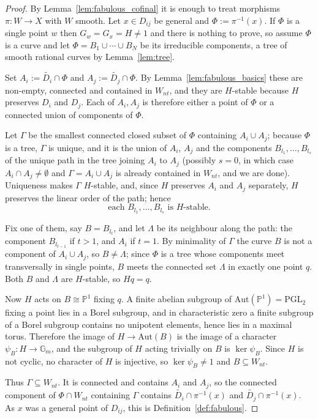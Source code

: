 \documentclass[11pt]{amsart}
\theoremstyle{plain}
\theoremstyle{definition}
\theoremstyle{remark}
\numberwithin{equation}{section}
\begin{document}
\begin{proof}
By Lemma~\ref{lem:fabulous_cofinal} it is enough to treat morphisms
$\pi : W \to X$ with $W$ smooth.  Let $x \in D_{ij}$ be general and
$\Phi := \pi^{-1}(x)$.  If $\Phi$ is a single point $w$ then
$G_w = G_x = H \neq 1$ and there is nothing to prove, so assume $\Phi$ is a
curve and let $\Phi = B_1 \cup \cdots \cup B_N$ be its irreducible
components, a tree of smooth rational curves by Lemma~\ref{lem:tree}.

Set $A_i := \widetilde{D_i} \cap \Phi$ and $A_j := \widetilde{D_j} \cap
\Phi$.  By Lemma~\ref{lem:fabulous_basics} these are non-empty, connected
and contained in $W_{nt}$, and they are $H$-stable because $H$ preserves
$D_i$ and $D_j$.  Each of $A_i, A_j$ is therefore either a point of $\Phi$
or a connected union of components of $\Phi$.

Let $\Gamma$ be the smallest connected closed subset of $\Phi$ containing
$A_i \cup A_j$; because $\Phi$ is a tree, $\Gamma$ is unique, and it is the
union of $A_i$, $A_j$ and the components $B_{l_1}, \ldots, B_{l_s}$ of the
unique path in the tree joining $A_i$ to $A_j$ (possibly $s = 0$, in which
case $A_i \cap A_j \neq \emptyset$ and $\Gamma = A_i \cup A_j$ is already
contained in $W_{nt}$, and we are done).  Uniqueness makes $\Gamma$
$H$-stable, and, since $H$ preserves $A_i$ and $A_j$ separately, $H$
preserves the linear order of the path; hence
\[
\text{each } B_{l_1}, \ldots, B_{l_s} \text{ is } H\text{-stable.}
\]

Fix one of them, say $B = B_{l_t}$, and let $\Lambda$ be its neighbour along
the path: the component $B_{l_{t-1}}$ if $t > 1$, and $A_i$ if $t = 1$.  By
minimality of $\Gamma$ the curve $B$ is not a component of $A_i \cup A_j$,
so $B \neq \Lambda$; since $\Phi$ is a tree whose components meet
transversally in single points, $B$ meets the connected set $\Lambda$ in
exactly one point $q$.  Both $B$ and $\Lambda$ are $H$-stable, so $Hq = q$.

Now $H$ acts on $B \cong \mathbb{P}^1$ fixing $q$.  A finite abelian
subgroup of $\mathrm{Aut}(\mathbb{P}^1) = \mathrm{PGL}_2$ fixing a point
lies in a Borel subgroup, and in characteristic zero a finite subgroup of a
Borel subgroup contains no unipotent elements, hence lies in a maximal
torus.  Therefore the image of $H \to \mathrm{Aut}(B)$ is the image of a
character $\psi_B : H \to \mathbb{G}_m$, and the subgroup of $H$ acting
trivially on $B$ is $\ker \psi_B$.  Since $H$ is not cyclic, no character of
$H$ is injective, so $\ker\psi_B \neq 1$ and $B \subseteq W_{nt}$.

Thus $\Gamma \subseteq W_{nt}$.  It is connected and contains $A_i$ and
$A_j$, so the connected component of $\Phi \cap W_{nt}$ containing $\Gamma$
contains $\widetilde{D_i} \cap \pi^{-1}(x)$ and $\widetilde{D_j} \cap
\pi^{-1}(x)$.  As $x$ was a general point of $D_{ij}$, this is
Definition~\ref{def:fabulous}.
\end{proof}
\end{document}
